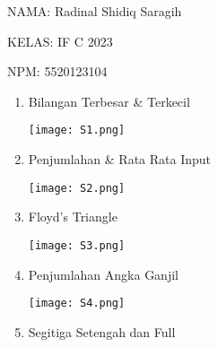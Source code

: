 \documentclass[8pt, a4paper]{article}
\date{}
\newcommand{\lstinputwithcaption}[2]{%
    }
\begin{document}
      NAMA: Radinal Shidiq Saragih

      KELAS: IF C 2023

      NPM: 5520123104

      \begin{enumerate}
        \item Bilangan Terbesar \& Terkecil

          \begin{multicols}{2}
            \begin{center}
            \lstinputwithcaption{./code/src/soal1/Main.java}{Main.java}
              \texttt{[image: S1.png]}
            \end{center}
          \end{multicols}

        \item Penjumlahan \& Rata Rata Input

          \begin{multicols}{2}
            \begin{center}
              \lstinputwithcaption{./code/src/soal2/Main.java}{Main.java}
              \texttt{[image: S2.png]}
            \end{center}
          \end{multicols}

        \item Floyd's Triangle

          \begin{multicols}{2}
            \begin{center}
              \lstinputwithcaption{./code/src/soal3/Main.java}{Main.java}
              \texttt{[image: S3.png]}
            \end{center}
          \end{multicols}


        \item Penjumlahan Angka Ganjil

          \begin{multicols}{2}
            \begin{center}
              \lstinputwithcaption{./code/src/soal4/Main.java}{Main.java}
              \texttt{[image: S4.png]}
            \end{center}
          \end{multicols}

        \item Segitiga Setengah dan Full


\end{enumerate}
\end{document}
